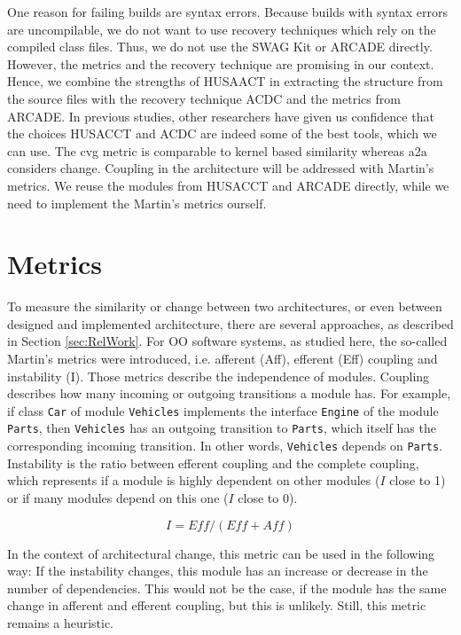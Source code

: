 \documentclass[sigplan, anonymous, review]{acmart}
\begin{document}
One reason for failing builds are syntax errors. Because builds with syntax errors are uncompilable, we do not want to use recovery techniques which rely on the compiled class files. Thus, we do not use the SWAG Kit or ARCADE directly.
However, the metrics and the recovery technique are promising in our context. Hence, we combine the strengths of HUSAACT in extracting the structure from the source files with the recovery technique ACDC and the metrics from ARCADE. 
In previous studies, other researchers \cite{MScSteffen, arcRec-comparison} have given us confidence that the choices HUSACCT and ACDC are indeed some of the best tools, which we can use.
The cvg metric is comparable to kernel based similarity whereas a2a considers change. Coupling in the architecture will be addressed with Martin's metrics. We reuse the modules from HUSACCT and ARCADE directly, while we need to implement the Martin's metrics ourself. 

\section{Metrics} \label{sec:Metrics}

To measure the similarity or change between two architectures, or even between designed and implemented architecture, there are several approaches, as described in Section \ref{sec:RelWork}. For OO software systems, as studied here, the so-called Martin's metrics \cite{martinsMetrics} were introduced, i.e. afferent (Aff), efferent (Eff) coupling and instability (I).
Those metrics describe the independence of modules. Coupling describes how many incoming or outgoing transitions a module has. For example, if class \texttt{Car} of module \texttt{Vehicles} implements the interface \texttt{Engine} of the module \texttt{Parts}, then \texttt{Vehicles} has an outgoing transition to \texttt{Parts}, which itself has the corresponding incoming transition. In other words, \texttt{Vehicles} depends on \texttt{Parts}.
Instability is the ratio between efferent coupling and the complete coupling, which represents if a module is highly dependent on other modules ($I$ close to 1) or if many modules depend on this one ($I$ close to 0).

\begin{equation} \label{eq:inst}
I = \textit{Eff} / (\textit{Eff} + \textit{Aff})
\end{equation}

In the context of architectural change, this metric can be used in the following way: If the instability changes, this module has an increase or decrease in the number of dependencies. This would not be the case, if the module has the same change in afferent and efferent coupling, but this is unlikely. Still, this metric remains a heuristic.
\end{document}
